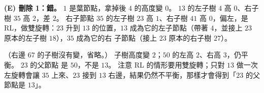 \begin{pastsoln}
\textbf{(E) 刪除 1：錯。} $1$ 是葉節點，拿掉後 $4$ 的高度變 $0$。 $13$ 的左子樹 $4$ 高 $0$、右子樹 $35$
高 $2$，差 $2$。 右子節點 $35$ 的左子樹 $23$ 高 $1$、右子樹 $41$ 高 $0$，偏左，是 RL，做雙旋轉：$23$
升到 $13$ 的位置，$13$ 成為它的左子節點（帶著 $4$，並接上 $23$ 原本的左子樹 $18$），$35$ 成為它的右
子節點（接上 $23$ 原本的右子樹 $27$）。
\begin{center}
\end{center}
（右邊 $67$ 的子樹沒有變，省略。） 子樹高度變 $2$；$50$ 的左高 $2$、右高 $3$，仍平衡。 $23$ 的父節點
是 $50$，不是 $13$。 注意 RL 的情形要用雙旋轉；只對 $13$ 做一次左旋轉會讓 $35$ 上來、$23$ 接到 $13$
右邊，結果仍然不平衡，那樣才會得到「$23$ 的父節點是 $13$」。
\end{pastsoln}
